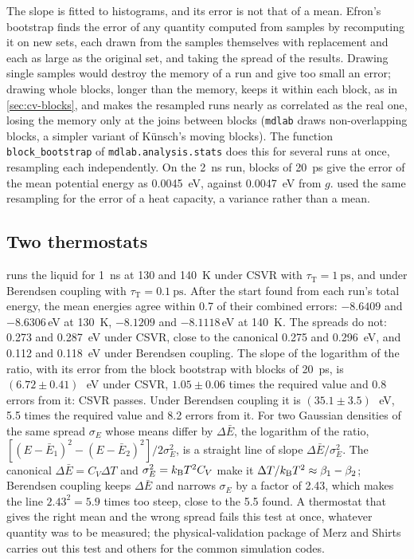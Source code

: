 The slope is fitted to histograms, and its error is not that of a mean.
Efron's bootstrap finds the error of any quantity computed from samples
by recomputing it on new sets, each drawn from the samples themselves
with replacement and each as large as the original set, and taking the
spread of the results\cite{Efron1979}. Drawing single samples would destroy the memory of
a run and give too small an error; drawing whole blocks, longer than the
memory, keeps it within each block, as in \cref{sec:cv-blocks}, and makes
the resampled runs nearly as correlated as the real one, losing the memory
only at the joins between blocks\cite{Kunsch1989} (\texttt{mdlab} draws
non-overlapping blocks, a simpler variant of Künsch's moving blocks). The
function \texttt{block\_bootstrap} of \texttt{mdlab.analysis.stats} does
this for several runs at once, resampling each independently. On the
\SI{2}{\nano\second} run, blocks of \SI{20}{\pico\second} give the error
of the mean potential energy as \SI{0.0045}{\electronvolt}, against
\SI{0.0047}{\electronvolt} from $g$.  used the
same resampling for the error of a heat capacity, a variance rather than a
mean.

\subsection*{Two thermostats}

 runs the liquid for \SI{1}{\nano\second} at 130 and
\SI{140}{\kelvin} under CSVR with $\tau_{\mathrm T} = \SI{1}{\pico\second}$,
and under Berendsen coupling with $\tau_{\mathrm T} = \SI{0.1}{\pico
\second}$. After the start found from each run's total energy, the mean
energies agree within 0.7 of their combined errors: $-8.6409$ and
$-8.6306$\,\si{\electronvolt} at \SI{130}{\kelvin}, $-8.1209$ and
$-8.1118$\,\si{\electronvolt} at \SI{140}{\kelvin}. The spreads do not:
0.273 and \SI{0.287}{\electronvolt} under CSVR, close to the canonical 0.275
and \SI{0.296}{\electronvolt}, and 0.112 and
\SI{0.118}{\electronvolt} under Berendsen coupling. The slope of the
logarithm of the ratio, with its error from the block bootstrap with
blocks of \SI{20}{\pico\second}, is $(6.72 \pm 0.41)$\,\si{\per\electronvolt}
under CSVR, $1.05 \pm 0.06$ times the required value and 0.8 errors from
it: CSVR passes. Under Berendsen coupling it is $(35.1 \pm
3.5)$\,\si{\per\electronvolt}, 5.5 times the required value and 8.2 errors
from it. For two Gaussian densities of the same spread $\sigma_E$ whose
means differ by $\Delta\bar E$, the logarithm of the ratio, $[(E - \bar
E_1)^2 - (E - \bar E_2)^2]/2\sigma_E^2$, is a straight line of slope
$\Delta\bar E/\sigma_E^2$. The canonical $\Delta\bar E = C_V\Delta T$ and
$\sigma_E^2 = k_{\mathrm{B}} T^2C_V$ make it $\Delta T/k_{\mathrm{B}} T^2 \approx \beta_1 -
\beta_2$; Berendsen coupling keeps $\Delta\bar E$ and narrows $\sigma_E$ by
a factor of 2.43, which makes the line $2.43^2 = 5.9$ times too steep, close
to the 5.5 found. A thermostat that gives the right mean and the
wrong spread fails this test at once, whatever quantity was to be
measured; the physical-validation package of Merz and Shirts carries out
this test and others for the common simulation codes\cite{Merz2018}.

